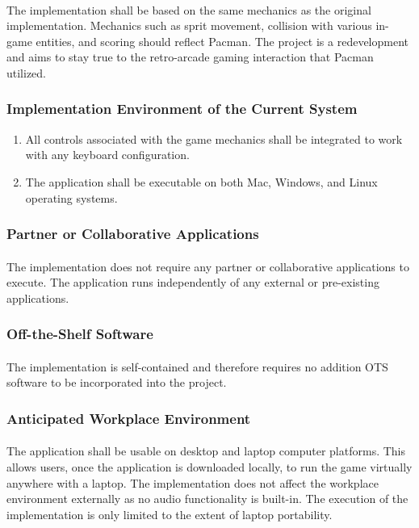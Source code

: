 \documentclass[12pt, titlepage]{article}
\begin{document}
\paragraph{}
The implementation shall be based on the same mechanics as the original implementation. Mechanics such as sprit movement, collision with various in-game entities, and scoring should reflect Pacman. The project is a redevelopment and aims to stay true to the retro-arcade gaming interaction that Pacman utilized. 

\subsubsection{Implementation Environment of the Current System}
\begin{enumerate}[i]
\item All controls associated with the game mechanics shall be integrated to work with any keyboard configuration.
\item The application shall be executable on both Mac, Windows, and Linux operating systems.
\end{enumerate} 

\subsubsection{Partner or Collaborative Applications}
\paragraph{}
The implementation does not require any partner or collaborative applications to execute. The application runs independently of any external or pre-existing applications.

\subsubsection{Off-the-Shelf Software}
\paragraph{}
The implementation is self-contained and therefore requires no addition OTS software to be incorporated into the project.

\subsubsection{Anticipated Workplace Environment}
\paragraph{}
The application shall be usable on desktop and laptop computer platforms. This allows users, once the application is downloaded locally, to run the game virtually anywhere with a laptop. The implementation does not affect the workplace environment externally as no audio functionality is built-in. The execution of the implementation is only limited to the extent of laptop portability.
 
\end{document}
